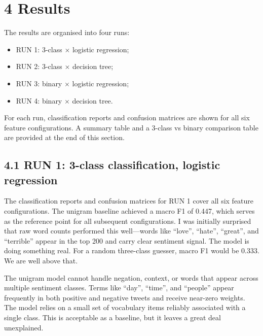\documentclass[12pt]{article}
\begin{document}
\section*{4 Results}



The results are organised into four runs:

\begin{itemize}

  \item RUN 1: 3-class $\times$ logistic regression;

  \item RUN 2: 3-class $\times$ decision tree;

  \item RUN 3: binary $\times$ logistic regression;

  \item RUN 4: binary $\times$ decision tree.

\end{itemize} For each run, classification reports and confusion matrices are shown for all six feature configurations. A summary table and a 3-class vs binary comparison table are provided at the end of this section.



\subsection*{4.1 RUN 1: 3-class classification, logistic regression}



The classification reports and confusion matrices for RUN 1 cover all six feature configurations. The unigram baseline achieved a macro F1 of 0.447, which serves as the reference point for all subsequent configurations. I was initially surprised that raw word counts performed this well---words like ``love'', ``hate'', ``great'', and ``terrible'' appear in the top 200 and carry clear sentiment signal. The model is doing something real. For a random three-class guesser, macro F1 would be 0.333. We are well above that.

The unigram model cannot handle negation, context, or words that appear across multiple sentiment classes. Terms like ``day'', ``time'', and ``people'' appear frequently in both positive and negative tweets and receive near-zero weights. The model relies on a small set of vocabulary items reliably associated with a single class. This is acceptable as a baseline, but it leaves a great deal unexplained.
\end{document}
